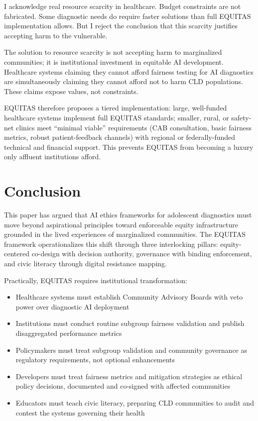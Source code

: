 \documentclass[12pt,a4paper]{article}
\begin{document}
I acknowledge real resource scarcity in healthcare. Budget constraints are not fabricated. Some diagnostic needs do require faster solutions than full EQUITAS implementation allows. But I reject the conclusion that this scarcity justifies accepting harm to the vulnerable.

The solution to resource scarcity is not accepting harm to marginalized communities; it is institutional investment in equitable AI development. Healthcare systems claiming they cannot afford fairness testing for AI diagnostics are simultaneously claiming they cannot afford not to harm CLD populations. These claims expose values, not constraints.

EQUITAS therefore proposes a tiered implementation: large, well-funded healthcare systems implement full EQUITAS standards; smaller, rural, or safety-net clinics meet ``minimal viable'' requirements (CAB consultation, basic fairness metrics, robust patient-feedback channels) with regional or federally-funded technical and financial support. This prevents EQUITAS from becoming a luxury only affluent institutions afford.

\section{Conclusion}

This paper has argued that AI ethics frameworks for adolescent diagnostics must move beyond aspirational principles toward enforceable equity infrastructure grounded in the lived experiences of marginalized communities. The EQUITAS framework operationalizes this shift through three interlocking pillars: equity-centered co-design with decision authority, governance with binding enforcement, and civic literacy through digital resistance mapping.

Practically, EQUITAS requires institutional transformation:

\begin{itemize}
\item Healthcare systems must establish Community Advisory Boards with veto power over diagnostic AI deployment
\item Institutions must conduct routine subgroup fairness validation and publish disaggregated performance metrics
\item Policymakers must treat subgroup validation and community governance as regulatory requirements, not optional enhancements
\item Developers must treat fairness metrics and mitigation strategies as ethical policy decisions, documented and co-signed with affected communities
\item Educators must teach civic literacy, preparing CLD communities to audit and contest the systems governing their health
\end{itemize}
\end{document}
